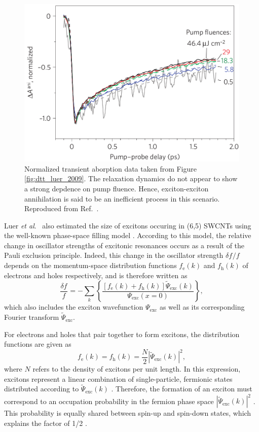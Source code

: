 \begin{figure}[ht]
	\centering
	\includegraphics[scale=1.2]{images/chapter_prior_works/dtt_3_luer_2009}
	\caption{Normalized transient aborption data taken from Figure \ref{fig:dtt_luer_2009}. The relaxation dynamics do not appear to show a strong depdence on pump fluence. Hence, exciton-exciton annihilation is said to be an inefficient process in this scenario. Reproduced from Ref.\ \cite{luer2009size}.}
	\label{fig:dtt_2_luer_2009}
\end{figure}

Luer \textit{et al}.\ \cite{luer2009size} also estimated the size of excitons occuring in (6,5) SWCNTs using the well-known phase-space filling model \cite{schmitt1985theory, greene1990all}. According to this model, the relative change in oscillator strengths of excitonic resonances occurs as a result of the Pauli exclusion principle. Indeed, this change in the oscillator strength $\delta f_\text{}/ f_\text{}$ depends on the momentum-space distribution functions $f_\text{e}(k)$ and $f_\text{h}(k)$ of electrons and holes respectively, and is therefore written as
\begin{equation}
	\frac{\delta f_\text{}}{f_\text{}} = - \sum_{k} \left\{ \frac{ [ f_\text{e}(k) + f_\text{h}(k)] \tilde{\Psi}_\text{exc}(k)}{\Psi_\text{exc}(x=0)} \right\},
	\label{eq:osc_strength}
\end{equation}
which also includes the exciton wavefunction $\Psi_\text{exc}$ as well as its corresponding Fourier transform $\tilde{\Psi}_\text{exc}$.

For electrons and holes that pair together to form excitons, the distribution functions are given as
%
\begin{equation}
	f_\text{e}(k) = f_\text{h}(k) = \frac{N}{2} | \tilde{\Psi}_\text{exc}(k)|^2,
\end{equation}
%
where $N$ refers to the density of excitons per unit length. In this expression, excitons represent a linear combination of single-particle, fermionic states distributed according to $\tilde{\Psi}_\text{exc}(k)$ \cite{schmitt1985theory}. Therefore, the formation of an exciton must correspond to an occupation probability in the fermion phase space $|\tilde{\Psi}_\text{exc}(k)|^2$ \cite{schmitt1985theory}. This probability is equally shared between spin-up and spin-down states, which explains the factor of 1/2 \cite{schmitt1985theory}.

